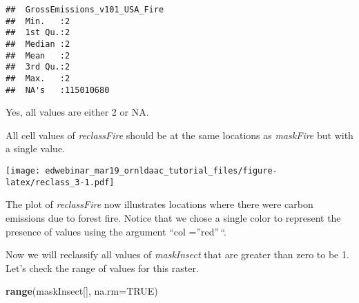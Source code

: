 \documentclass[
]{article}
\newenvironment{Shaded}{\begin{snugshade}}{\end{snugshade}}
\newcommand{\AttributeTok}[1]{\textcolor[rgb]{0.13,0.29,0.53}{#1}}
\newcommand{\CommentTok}[1]{\textcolor[rgb]{0.56,0.35,0.01}{\textit{#1}}}
\newcommand{\ConstantTok}[1]{\textcolor[rgb]{0.56,0.35,0.01}{#1}}
\newcommand{\FloatTok}[1]{\textcolor[rgb]{0.00,0.00,0.81}{#1}}
\newcommand{\FunctionTok}[1]{\textcolor[rgb]{0.13,0.29,0.53}{\textbf{#1}}}
\newcommand{\NormalTok}[1]{#1}
\newcommand{\SpecialCharTok}[1]{\textcolor[rgb]{0.81,0.36,0.00}{\textbf{#1}}}
\newcommand{\StringTok}[1]{\textcolor[rgb]{0.31,0.60,0.02}{#1}}
\begin{document}
\begin{verbatim}
##  GrossEmissions_v101_USA_Fire
##  Min.   :2                   
##  1st Qu.:2                   
##  Median :2                   
##  Mean   :2                   
##  3rd Qu.:2                   
##  Max.   :2                   
##  NA's   :115010680
\end{verbatim}

Yes, all values are either 2 or NA.

All cell values of \emph{reclassFire} should be at the same locations as
\emph{maskFire} but with a single value.

\begin{Shaded}
\end{Shaded}

\texttt{[image: edwebinar\_mar19\_ornldaac\_tutorial\_files/figure-latex/reclass\_3-1.pdf]}

The plot of \emph{reclassFire} now illustrates locations where there
were carbon emissions due to forest fire. Notice that we chose a single
color to represent the presence of values using the argument ``col
=''red''\,``.

Now we will reclassify all values of \emph{maskInsect} that are greater
than zero to be 1. Let's check the range of values for this raster.

\begin{Shaded}
\begin{Highlighting}[]
\FunctionTok{range}\NormalTok{(maskInsect[], }\AttributeTok{na.rm=}\ConstantTok{TRUE}\NormalTok{)}
\end{Highlighting}
\end{Shaded}
\end{document}
